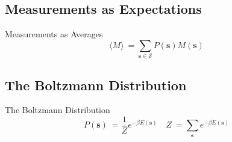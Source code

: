 \documentclass{beamer}
\newcommand{\bolds}[1]{\boldsymbol{#1}}
\newcommand{\expect}[1]{\langle{}{#1}\rangle{}}
\newcommand{\mcS}{\mathcal{S}}
\newcommand{\bs}{\bolds{s}}
\renewcommand{\b}{\beta}
\begin{document}

\subsection{Measurements as Expectations}
\begin{frame}{Measurements as Averages}
  \begin{equation}%
   \boxed{ \expect{M}\:=\sum_{\bs\in\mcS} P(\bs) M(\bs)\label{eq:expectation-as-average}}
  \end{equation}
\end{frame}

\subsection{The Boltzmann Distribution}
\begin{frame}{The Boltzmann Distribution}
  \begin{equation}%
    \boxed{P(\bs)\:=\frac{1}{Z}e^{-\b E(\bs)}\quad Z\:=\sum_{\bs} e^{-\b E(\bs)}}\label{eq:boltzmann-distribution}
  \end{equation}%
\end{frame}
\end{document}
